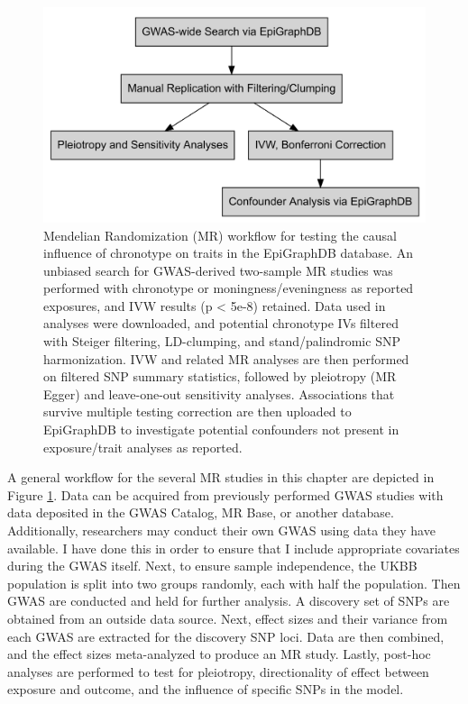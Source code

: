 \documentclass[journal,article,submit,moreauthors,pdftex]{Definitions/mdpi}
\begin{document}
\begin{figure}[htbp]
	\centering
	\includegraphics[width=0.5\linewidth]{Figs/Analysis1/outline.png}
	\caption{Mendelian Randomization (MR) workflow for testing the causal influence of chronotype on traits in the EpiGraphDB database. An unbiased search for GWAS-derived two-sample MR studies was performed with chronotype or moningness/eveningness as reported exposures, and IVW results (p < 5e-8) retained. Data used in analyses were downloaded, and potential chronotype IVs filtered with Steiger filtering, LD-clumping, and stand/palindromic SNP harmonization. IVW and related MR analyses are then performed on filtered SNP summary statistics, followed by pleiotropy (MR Egger) and leave-one-out sensitivity analyses. Associations that survive multiple testing correction are then uploaded to EpiGraphDB to investigate potential confounders not present in exposure/trait analyses as reported.}
	\label{fig:MR_Workflow}
\end{figure}












A general workflow for the several MR studies in this chapter are depicted in Figure \ref{fig:MR_Workflow}. Data can be acquired from previously performed GWAS studies with data deposited in the GWAS Catalog, MR Base, or another database. Additionally, researchers may conduct their own GWAS using data they have available. I have done this in order to ensure that I include appropriate covariates during the GWAS itself. Next, to ensure sample independence, the UKBB population is split into two groups randomly, each with half the population. Then GWAS are conducted and held for further analysis. A discovery set of SNPs are obtained from an outside data source. Next, effect sizes and their variance from each GWAS are extracted for the discovery SNP loci. Data are then combined, and the effect sizes meta-analyzed to produce an MR study. Lastly, post-hoc analyses are performed to test for pleiotropy, directionality of effect between exposure and outcome, and the influence of specific SNPs in the model.
\end{document}

